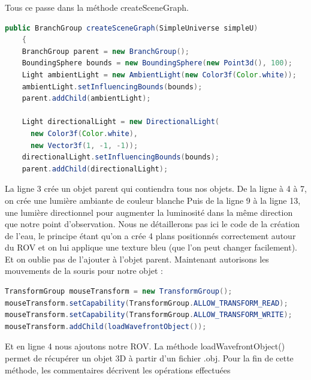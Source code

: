 \documentclass[a4paper,11pt]{report}
\begin{document}
		\newline Tous ce passe dans la méthode createSceneGraph.
		\begin{lstlisting}[language=java]
public BranchGroup createSceneGraph(SimpleUniverse simpleU) 
	{
    BranchGroup parent = new BranchGroup();
    BoundingSphere bounds = new BoundingSphere(new Point3d(), 100);
    Light ambientLight = new AmbientLight(new Color3f(Color.white));
    ambientLight.setInfluencingBounds(bounds);
    parent.addChild(ambientLight);
		
    Light directionalLight = new DirectionalLight(
      new Color3f(Color.white),
      new Vector3f(1, -1, -1));
    directionalLight.setInfluencingBounds(bounds);
    parent.addChild(directionalLight);
		\end{lstlisting}
		La ligne 3 crée un objet parent qui contiendra tous nos objets.
		\newline De la ligne à 4 à 7, on crée une lumière ambiante de couleur blanche
		\newline Puis de la ligne 9 à la ligne 13, une lumière directionnel pour augmenter la luminosité dans la même direction que notre point d'observation.
		\newline Nous ne détaillerons pas ici le code de la création de l'eau, le principe étant qu'on a crée 4 plans positionnés correctement autour du ROV et on lui applique une texture bleu (que l'on peut changer facilement). Et on oublie pas de l'ajouter à l'objet parent.
		\newline Maintenant autorisons les mouvements de la souris pour notre objet :
		\begin{lstlisting}[language=java]
TransformGroup mouseTransform = new TransformGroup();
mouseTransform.setCapability(TransformGroup.ALLOW_TRANSFORM_READ);
mouseTransform.setCapability(TransformGroup.ALLOW_TRANSFORM_WRITE);
mouseTransform.addChild(loadWavefrontObject());
		\end{lstlisting}
		Et en ligne 4 nous ajoutons notre ROV. La méthode loadWavefrontObject() permet de récupérer un objet 3D à partir d'un fichier .obj.
		\newline Pour la fin de cette méthode, les commentaires décrivent les opérations effectuées
\end{document}
